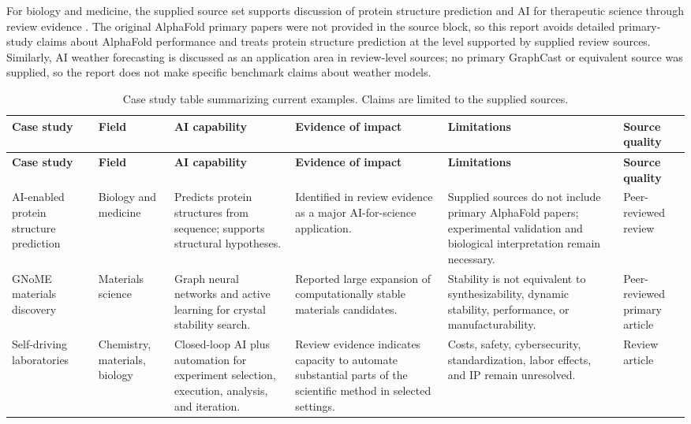 \documentclass[12pt]{article}
\begin{document}
For biology and medicine, the supplied source set supports discussion of protein structure prediction and AI for therapeutic science through review evidence \cite{ref1}. The original AlphaFold primary papers were not provided in the source block, so this report avoids detailed primary-study claims about AlphaFold performance and treats protein structure prediction at the level supported by supplied review sources. Similarly, AI weather forecasting is discussed as an application area in review-level sources; no primary GraphCast or equivalent source was supplied, so the report does not make specific benchmark claims about weather models.

\begin{longtable}{p{3.0cm}p{2.1cm}p{2.9cm}p{3.2cm}p{3.0cm}p{2.4cm}}
\caption{Case study table summarizing current examples. Claims are limited to the supplied sources.}\\
\toprule
\textbf{Case study} & \textbf{Field} & \textbf{AI capability} & \textbf{Evidence of impact} & \textbf{Limitations} & \textbf{Source quality} \\
\midrule
\endfirsthead
\toprule
\textbf{Case study} & \textbf{Field} & \textbf{AI capability} & \textbf{Evidence of impact} & \textbf{Limitations} & \textbf{Source quality} \\
\midrule
\endhead
AI-enabled protein structure prediction & Biology and medicine & Predicts protein structures from sequence; supports structural hypotheses. & Identified in review evidence as a major AI-for-science application. & Supplied sources do not include primary AlphaFold papers; experimental validation and biological interpretation remain necessary. & Peer-reviewed review \cite{ref1} \\
GNoME materials discovery & Materials science & Graph neural networks and active learning for crystal stability search. & Reported large expansion of computationally stable materials candidates. & Stability is not equivalent to synthesizability, dynamic stability, performance, or manufacturability. & Peer-reviewed primary article \cite{ref6} \\
Self-driving laboratories & Chemistry, materials, biology & Closed-loop AI plus automation for experiment selection, execution, analysis, and iteration. & Review evidence indicates capacity to automate substantial parts of the scientific method in selected settings. & Costs, safety, cybersecurity, standardization, labor effects, and IP remain unresolved. & Review article \cite{ref5} \\

\end{longtable}
\end{document}
